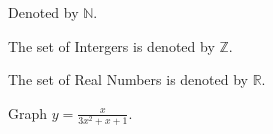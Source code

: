 \documentclass[11pt]{article}
\def\eq1{y=\frac{x}{3x^2+x+1}}
\begin{document}
Denoted by $\mathbb{N}$.

The set of Intergers is denoted by $\mathbb{Z}$.

The set of Real Numbers is denoted by $\mathbb{R}$.

Graph $\eq1$.
\end{document}
